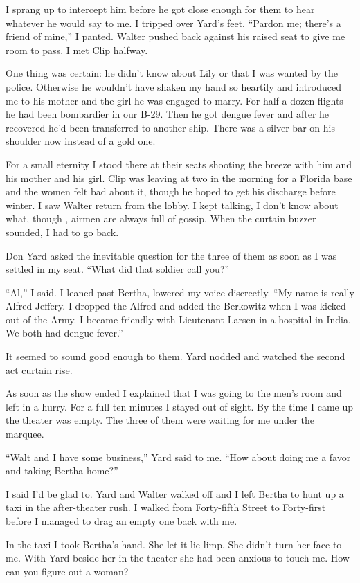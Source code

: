\documentclass{novel}
\begin{document}
I sprang up to intercept him before he got close enough for them to hear whatever he would say to me. I tripped over Yard’s feet. “Pardon me; there’s a friend of mine,” I panted. Walter pushed back against his raised seat to give me room to pass. I met Clip halfway.

One thing was certain: he didn’t know about Lily or that I was wanted by the police. Otherwise he wouldn’t have shaken my hand so heartily and introduced me to his mother and the girl he was engaged to marry. For half a dozen flights he had been bombardier in our B-29. Then he got dengue fever and after he recovered he’d been transferred to another ship. There was a silver bar on his shoulder now instead of a gold one.

For a small eternity I stood there at their seats shooting the breeze with him and his mother and his girl. Clip was leaving at two in the morning for a Florida base and the women felt bad about it, though he hoped to get his discharge before winter. I saw Walter return from the lobby. I kept talking, I don’t know about what, though , airmen are always full of gossip. When the curtain buzzer sounded, I had to go back.

Don Yard asked the inevitable question for the three of them as soon as I was settled in my seat. “What did that soldier call you?”

“Al,” I said. I leaned past Bertha, lowered my voice discreetly. “My name is really Alfred Jeffery. I dropped the Alfred and added the Berkowitz when I was kicked out of the Army. I became friendly with Lieutenant Larsen in a hospital in India. We both had dengue fever.”

It seemed to sound good enough to them. Yard nodded and watched the second act curtain rise.

\scenestars

As soon as the show ended I explained that I was going to the men’s room and left in a hurry. For a full ten minutes I stayed out of sight. By the time I came up the theater was empty. The three of them were waiting for me under the marquee.

“Walt and I have some business,” Yard said to me. “How about doing me a favor and taking Bertha home?”

I said I’d be glad to. Yard and Walter walked off and I left Bertha to hunt up a taxi in the after-theater rush. I walked from Forty-fifth Street to Forty-first before I managed to drag an empty one back with me.

In the taxi I took Bertha’s hand. She let it lie limp. She didn’t turn her face to me. With Yard beside her in the theater she had been anxious to touch me. How can you figure out a woman?
\end{document}
